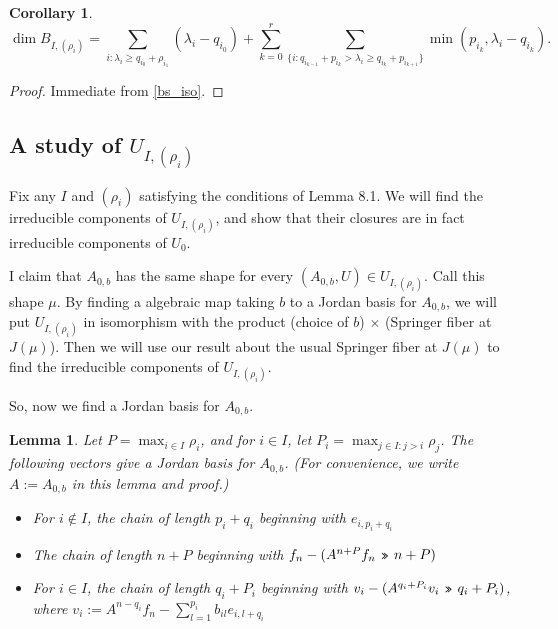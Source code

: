 \documentclass[12pt,psamsfonts]{article}
\newcommand{\leftshift}{\,\texttt{<<}\,}
\newcommand{\rightshift}{\mathbin{\rotatebox[origin=c]{180}{\leftshift}}}
\newtheorem{lemma}[theorem]{Lemma}
\newtheorem{corollary}[theorem]{Corollary}
\begin{document}
\begin{corollary}\label{bs_dim}
    \[\dim B_{I, (\rho_i)} = \sum_{i : \lambda_i \geq q_{i_0} + \rho_{i_1}} (\lambda_i - q_{i_0}) + \sum_{k = 0}^r \sum_{\{i : q_{i_{k - 1}} + p_{i_k} > \lambda_i \geq q_{i_k} + p_{i_{k + 1}}\}} \min(p_{i_k}, \lambda_i - q_{i_k}).\]
\end{corollary}
\begin{proof}
    Immediate from \cref{bs_iso}.
\end{proof}

\subsection{A study of \(U_{I, (\rho_i)}\)}
Fix any \(I\) and \((\rho_i)\) satisfying the conditions of Lemma 8.1.
We will find the irreducible components of \(U_{I, (\rho_i)}\), and show that their closures are in fact irreducible components of \(U_0\).
\par I claim that \(A_{0,b}\) has the same shape for every \((A_{0, b}, U) \in U_{I, (\rho_i)}\).
Call this shape \(\mu\).
By finding a algebraic map taking \(b\) to a Jordan basis for \(A_{0,b}\), we will put \(U_{I, (\rho_i)}\) in isomorphism with the product (choice of \(b\)) \(\times\) (Springer fiber at \(J(\mu)\)).
Then we will use our result about the usual Springer fiber at \(J(\mu)\) to find the irreducible components of \(U_{I, (\rho_i)}\).
\par So, now we find a Jordan basis for \(A_{0, b}\).
\begin{lemma}
    Let \(P = \max_{i \in I} \rho_i\), and for \(i \in I\), let \(P_i = \max_{j \in I : j > i} \rho_j\).
    The following vectors give a Jordan basis for \(A_{0,b}\).
    (For convenience, we write \(A := A_{0,b}\) in this lemma and proof.)
    \begin{itemize}
        \item For \(i \notin I\), the chain of length \(p_i + q_i\) beginning with \(e_{i, p_i + q_i}\)
        \item The chain of length \(n + P\) beginning with \(f_n - (A^{n + P}f_n \rightshift n + P)\)
        \item For \(i \in I\), the chain of length \(q_i + P_i\) beginning with \(v_i - (A^{q_i + P_i} v_i \rightshift q_i + P_i)\), where \(v_i := A^{n - q_i} f_n - \sum_{l = 1}^{p_i} b_{il} e_{i,l + q_i}\)
    \end{itemize}
\end{lemma}
\end{document}
